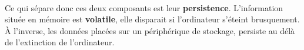 {  \paragraph{} Ce qui sépare donc ces deux composants est leur \textbf{persistence}. L'information
  située en mémoire est \textbf{volatile}, elle disparait si l'ordinateur s'éteint brusquement. À
  l'inverse, les données placées sur un périphérique de stockage, persiste au délà de l'extinction de
  l'ordinateur.
}


